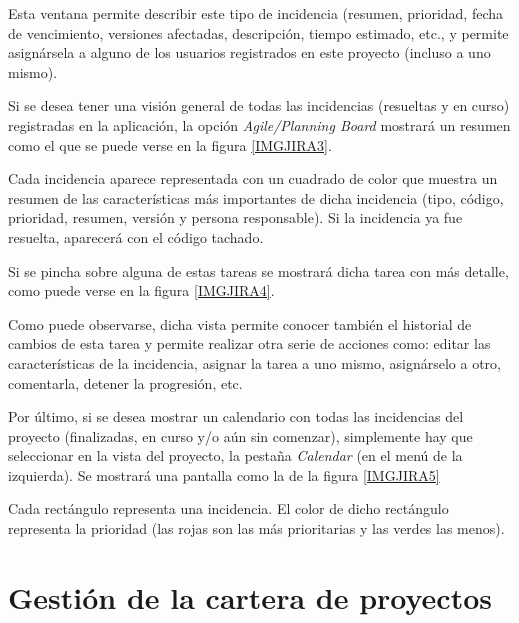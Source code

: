\documentclass[11pt,a4paper,spanish,twoside]{report}
\begin{document}

	Esta ventana permite describir este tipo de incidencia (resumen, prioridad,
	fecha de vencimiento, versiones afectadas, descripción, tiempo estimado,
	etc., y permite asignársela	a alguno de los usuarios registrados en este
	proyecto (incluso a uno mismo).

	Si se desea tener una visión general de todas las incidencias (resueltas y
	en curso) registradas en la aplicación, la opción \emph{Agile/Planning Board}
	mostrará un resumen como el que se puede verse en la figura \ref{IMGJIRA3}.


	Cada incidencia aparece representada con un cuadrado de color que muestra
	un resumen de las características más importantes de dicha incidencia
	(tipo, código, prioridad, resumen, versión y persona responsable). Si la
	incidencia ya fue resuelta, aparecerá con el código tachado.

	Si se pincha sobre alguna de estas tareas se mostrará dicha tarea con más
	detalle, como puede verse en la figura \ref{IMGJIRA4}.


	Como puede observarse, dicha vista permite conocer también el historial de
	cambios de esta tarea y permite realizar otra serie de acciones como:
	editar las características de la incidencia, asignar la tarea a uno mismo,
	asignárselo a otro, comentarla, detener la progresión, etc.

	Por último, si se desea mostrar un calendario con todas las incidencias del
	proyecto (finalizadas, en curso y/o aún sin comenzar), simplemente hay que
	seleccionar	en la vista del proyecto, la pestaña \emph{Calendar} (en el
	menú de la izquierda). Se mostrará una pantalla como la de la figura
	\ref{IMGJIRA5}


	Cada rectángulo representa una incidencia. El color de dicho rectángulo
	representa la prioridad (las rojas son las más prioritarias y las verdes
	las menos).

\chapter{Gestión de la cartera de proyectos}
\end{document}
